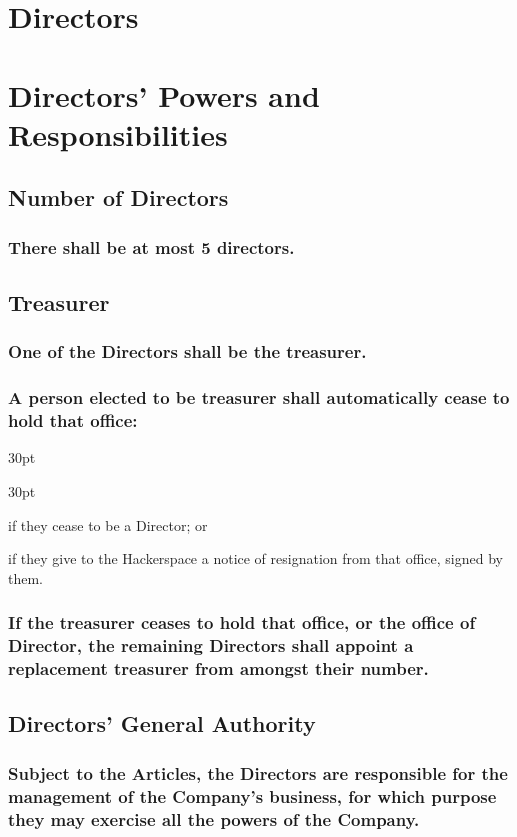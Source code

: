 \documentclass[12pt]{article}
\def\clauseindent{30pt}
\newenvironment{subindentlist}{\begin{adjustwidth}{\clauseindent}{}\begin{labeledlist}{\clauseindent}}{\end{labeledlist}\end{adjustwidth}}
\begin{document}
\section*{Directors}
\section*{Directors' Powers and Responsibilities}

\subsection{Number of Directors}
\subsubsection{\label{subsubsection:numdirectors}There shall be at most 5 directors.}

\subsection{Treasurer}
\subsubsection{One of the Directors shall be the treasurer.}
\subsubsection{A person elected to be treasurer shall automatically cease to hold that office:}
\begin{subindentlist}
  \item if they cease to be a Director; or
  \item if they give to the Hackerspace a notice of resignation from that office, signed by them.
\end{subindentlist}
\subsubsection{If the treasurer ceases to hold that office, or the office of Director, the remaining Directors shall appoint a replacement treasurer from amongst their number.}

\subsection{Directors' General Authority}
\subsubsection{Subject to the Articles, the Directors are responsible for the management of the Company's business, for which purpose they may exercise all the powers of the Company.}
\end{document}
